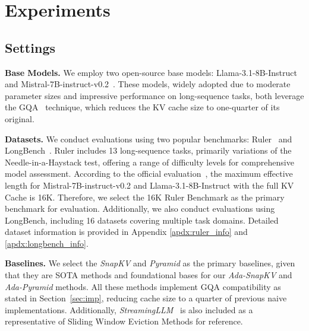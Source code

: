 

\section{Experiments}
\label{sec:exp}
\subsection{Settings}
\label{sec:settings}
{\bf Base Models.} We employ two open-source base models: Llama-3.1-8B-Instruct~\cite{llama3} and Mistral-7B-instruct-v0.2~\cite{jiang2023mistral}. These models, widely adopted due to moderate parameter sizes and impressive performance on long-sequence tasks, both leverage the GQA~\cite{GQA} technique, which reduces the KV cache size to one-quarter of its original.

{\bf Datasets.} We conduct evaluations using two popular benchmarks: Ruler~\cite{hsieh2024ruler} and LongBench~\cite{bai2023longbench}. Ruler includes 13 long-sequence tasks, primarily variations of the Needle-in-a-Haystack test, offering a range of difficulty levels for comprehensive model assessment. According to the official evaluation~\cite{hsieh2024ruler}, the maximum effective length for Mistral-7B-instruct-v0.2 and Llama-3.1-8B-Instruct with the full KV Cache is 16K. Therefore, we select the 16K Ruler Benchmark as the primary benchmark for evaluation. Additionally, we also conduct evaluations using LongBench, including 16 datasets covering multiple task domains. Detailed dataset information is provided in Appendix \ref{apdx:ruler_info} and \ref{apdx:longbench_info}. 



{\bf Baselines.} We select the \textit{SnapKV}\cite{SnapKV} and \textit{Pyramid}\cite{PyramidInfer, PyramidKV} as the primary baselines, given that they are SOTA methods and foundational bases for our \textit{Ada-SnapKV} and \textit{Ada-Pyramid} methods. All these methods implement GQA compatibility as stated in Section~\ref{sec:imp}, reducing cache size to a quarter of previous naive implementations.
Additionally, \textit{StreamingLLM}~\cite{SLM} is also included as a representative of Sliding Window Eviction Methods for reference.






